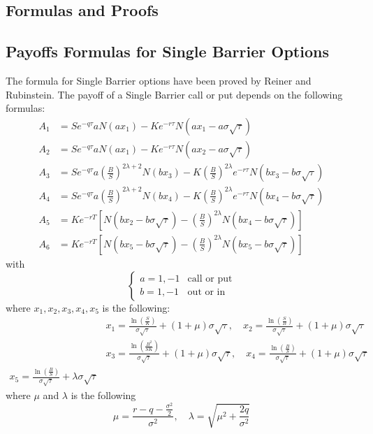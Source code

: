 \begin{appendices}
\chapter{Formulas and Proofs}
\section{Payoffs Formulas for Single Barrier Options}
\label{section:A1}
The formula for Single Barrier options have been proved by Reiner and Rubinstein. The payoff of a Single Barrier call or put depends on the following formulas:
\[
\begin{aligned}
	A_1&=Se^{-q\tau}aN(ax_1)-Ke^{-r\tau}N(ax_1-a\sigma\sqrt{\tau})\\
	A_2&=Se^{-q\tau}aN(ax_1)-Ke^{-r\tau}N(ax_2-a\sigma\sqrt{\tau})\\
	A_3&=Se^{-q\tau}a\left(\tfrac{B}{S}\right)^{2\lambda+2}N(bx_3)-K\left(\tfrac{B}{S}\right)^{2\lambda}e^{-r\tau}N(bx_3-b\sigma\sqrt{\tau})\\
	A_4&=Se^{-q\tau}a\left(\tfrac{B}{S}\right)^{2\lambda+2}N(bx_4)-K\left(\tfrac{B}{S}\right)^{2\lambda}e^{-r\tau}N(bx_4-b\sigma\sqrt{\tau})\\
	A_5&=Ke^{-rT}\left[N(bx_2-b\sigma\sqrt{\tau})-\left(\tfrac{B}{S}\right)^{2\lambda}N\left(bx_4-b\sigma\sqrt{\tau}\right)\right]\\
	A_6&=Ke^{-rT}\left[N(bx_5-b\sigma\sqrt{\tau})-\left(\tfrac{B}{S}\right)^{2\lambda}N\left(bx_5-b\sigma\sqrt{\tau}\right)\right]
\end{aligned}
\]
with
\[
\begin{cases}
	a=1,-1&\text{call or put}\\
	b=1,-1&\text{out or in}
\end{cases}
\]
where $x_1,x_2,x_3,x_4,x_5$ is the following:
\[
\begin{aligned}
	&x_1=\frac{\ln\left(\frac{S}{K}\right)}{\sigma\sqrt{\tau}}+(1+\mu)\sigma\sqrt{\tau},\quad x_2=\frac{\ln\left(\frac{S}{B}\right)}{\sigma\sqrt{\tau}}+(1+\mu)\sigma\sqrt{\tau}\\
	&x_3=\frac{\ln\left(\frac{B^2}{SK}\right)}{\sigma\sqrt{\tau}}+(1+\mu)\sigma\sqrt{\tau},\quad x_4=\frac{\ln\left(\frac{B}{S}\right)}{\sigma\sqrt{\tau}}+(1+\mu)\sigma\sqrt{\tau}\\
	x_5=\frac{\ln\left(\frac{B}{S}\right)}{\sigma\sqrt{\tau}}+\lambda\sigma\sqrt{\tau}
\end{aligned}
\]
where $\mu$ and $\lambda$ is the following
\[
\mu=\frac{r-q-\tfrac{\sigma^2}{2}}{\sigma^2},\quad\lambda=\sqrt{\mu^2+\frac{2q}{\sigma^2}}
\]
\newpage

\end{appendices}
